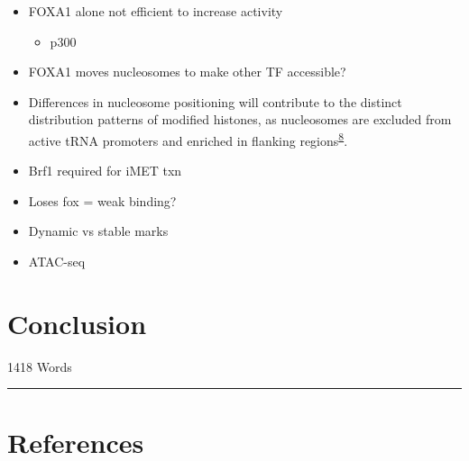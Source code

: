 \documentclass[
  12pt,
]{article}
\providecommand{\tightlist}{%
  \setlength{\itemsep}{0pt}\setlength{\parskip}{0pt}}
\begin{document}
\begin{itemize}
\item
  FOXA1 alone not efficient to increase activity

  \begin{itemize}
  \tightlist
  \item
    p300
  \end{itemize}
\item
  FOXA1 moves nucleosomes to make other TF accessible?
\item
  Differences in nucleosome positioning will contribute to the distinct distribution patterns of modified histones, as nucleosomes are excluded from active tRNA promoters and enriched in flanking regions\textsuperscript{\href{https://www.nature.com/articles/nrg3001\#ref-CR8}{8}}.
\item
  Brf1 required for iMET txn
\item
  Loses fox = weak binding?
\item
  Dynamic vs stable marks
\item
  ATAC-seq
\end{itemize}

\hypertarget{conclusion}{%
\section{Conclusion}\label{conclusion}}

\begin{flushright}
1418 Words
\end{flushright}

\begin{center}\rule{0.5\linewidth}{0.5pt}\end{center}

\hypertarget{references}{%
\section*{References}\label{references}}
\end{document}
